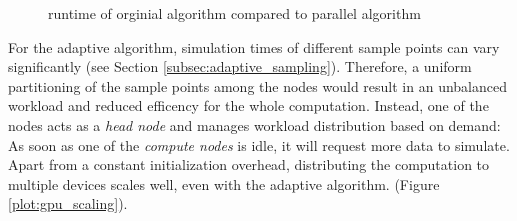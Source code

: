 \begin{figure}[H]
  \centerline{
    }
  \caption{runtime of orginial algorithm compared to parallel algorithm}
  \label{plot:runtime}
\end{figure}
For the adaptive algorithm, simulation times of different sample points can vary
significantly (see Section \ref{subsec:adaptive_sampling}). Therefore, a uniform
partitioning of the sample points among the nodes would result in an unbalanced
workload and reduced efficency for the whole computation. Instead, one of the
nodes acts as a \emph{head node} and manages workload distribution based on demand: As
soon as one of the \emph{compute nodes} is idle, it will request more data to simulate.
Apart from a constant initialization overhead, distributing the computation to
multiple devices scales well, even with the adaptive algorithm. (Figure
\ref{plot:gpu_scaling}).
